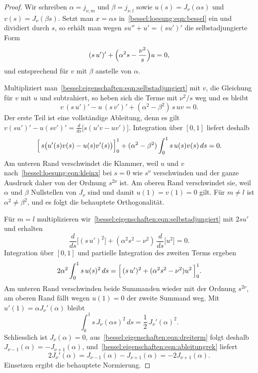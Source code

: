 \begin{proof}
Wir schreiben $\alpha=j_{\nu,m}$ und $\beta=j_{\nu,l}$ sowie $u(s)=J_\nu(\alpha s)$ und $v(s)=J_\nu(\beta s)$.
Setzt man $x=\alpha s$ in~\eqref{bessel:loesung:eqn:bessel} ein und dividiert durch $s$, so erhält man wegen $su''+u'=(su')'$ die selbstadjungierte Form
\begin{equation}
(s\,u')'
+
\Bigl(\alpha^2 s - \frac{\nu^2}{s}\Bigr) u
=
0,
\label{bessel:eigenschaften:eqn:selbstadjungiert}
\end{equation}
und entsprechend für $v$ mit $\beta$ anstelle von $\alpha$.

Multipliziert man~\eqref{bessel:eigenschaften:eqn:selbstadjungiert} mit $v$, die Gleichung für $v$ mit $u$ und subtrahiert, so heben sich die Terme mit $\nu^2/s$ weg und es bleibt
\[
v\,(s\,u')' - u\,(s\,v')'
+
(\alpha^2-\beta^2)\,s\,uv
=
0 .
\]
Der erste Teil ist eine vollständige Ableitung, denn es gilt
$v(su')'-u(sv')' = \frac{d}{ds}\bigl[s(u'v-uv')\bigr]$.
Integration über $[0,1]$ liefert deshalb
\[
\Bigl[\,s\bigl(u'(s)v(s)-u(s)v'(s)\bigr)\Bigr]_0^1
+
(\alpha^2-\beta^2)
\int_0^1 s\,u(s)v(s)\,ds
=
0 .
\]
Am unteren Rand verschwindet die Klammer, weil $u$ und $v$ nach~\eqref{bessel:loesung:eqn:kleinx} bei $s=0$ wie $s^{\nu}$ verschwinden und der ganze Ausdruck daher von der Ordnung $s^{2\nu}$ ist.
Am oberen Rand verschwindet sie, weil $\alpha$ und $\beta$ Nullstellen von $J_\nu$ sind und damit $u(1)=v(1)=0$ gilt.
Für $m\ne l$ ist $\alpha^2\ne\beta^2$, und es folgt die behauptete Orthogonalität.

Für $m=l$ multiplizieren wir~\eqref{bessel:eigenschaften:eqn:selbstadjungiert} mit $2su'$ und erhalten
\[
\frac{d}{ds}\bigl[(s\,u')^2\bigr]
+
(\alpha^2s^2-\nu^2)\,\frac{d}{ds}\bigl[u^2\bigr]
=
0 .
\]
Integration über $[0,1]$ und partielle Integration des zweiten Terms ergeben
\[
2\alpha^2
\int_0^1 s\,u(s)^2\,ds
=
\Bigl[\,(s\,u')^2 + (\alpha^2s^2-\nu^2)u^2\,\Bigr]_0^1 .
\]
Am unteren Rand verschwinden beide Summanden wieder mit der Ordnung $s^{2\nu}$, am oberen Rand fällt wegen $u(1)=0$ der zweite Summand weg.
Mit $u'(1)=\alpha J_\nu'(\alpha)$ bleibt
\[
\int_0^1 s\,J_\nu(\alpha s)^2\,ds
=
\frac{1}{2}\,J_\nu'(\alpha)^2 .
\]
Schliesslich ist $J_\nu(\alpha)=0$, aus~\eqref{bessel:eigenschaften:eqn:dreiterm} folgt deshalb $J_{\nu-1}(\alpha)=-J_{\nu+1}(\alpha)$, und~\eqref{bessel:eigenschaften:eqn:ableitungrek} liefert
\[
2J_\nu'(\alpha)
=
J_{\nu-1}(\alpha)-J_{\nu+1}(\alpha)
=
-2J_{\nu+1}(\alpha).
\]
Einsetzen ergibt die behauptete Normierung.
\end{proof}
 
